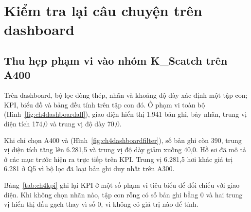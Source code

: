 \section{Kiểm tra lại câu chuyện trên dashboard}
\label{sec:ch4dashboard}

\subsection{Thu hẹp phạm vi vào nhóm K\_Scatch trên A400}

Trên dashboard, bộ lọc dòng thép, nhãn và khoảng độ dày xác định một tập con; KPI, biểu đồ và bảng đều tính trên tập con đó. Ở phạm vi toàn bộ (Hình~\ref{fig:ch4dashboardall}), giao diện hiển thị 1.941 bản ghi, bảy nhãn, trung vị diện tích 174,0 và trung vị độ dày 70,0.

\begin{center}\begin{minipage}{\linewidth}
\centering
{}
\label{fig:ch4dashboardall}
\end{minipage}\end{center}

Khi chỉ chọn A400 và  (Hình~\ref{fig:ch4dashboardfilter}), số bản ghi còn 390, trung vị diện tích tăng lên 6.281,5 và trung vị độ dày giảm xuống 40,0. Hồ sơ đã mô tả ở các mục trước hiện ra trực tiếp trên KPI. Trung vị 6.281,5 hơi khác giá trị 6.281 ở Q5 vì bộ lọc đã loại bản ghi  duy nhất trên A300.

\begin{center}\begin{minipage}{\linewidth}
\centering
{}
\label{fig:ch4dashboardfilter}
\end{minipage}\end{center}

Bảng~\ref{tab:ch4kpi} ghi lại KPI ở một số phạm vi tiêu biểu để đối chiếu với giao diện. Khi không chọn nhãn nào, tập con rỗng có số bản ghi bằng 0 và hai trung vị hiển thị dấu gạch thay vì số 0, vì không có giá trị nào để tính.

